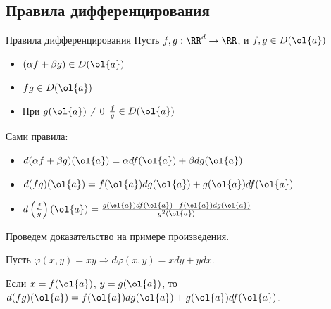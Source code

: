 \subsection{Правила дифференцирования}

\begin{prop}{Правила дифференцирования}{}
    Пусть \( f, g : \RR^d \to \RR \), и \( f, g \in D(\ol{a}) \)

    \begin{itemize}
        \item
            \( (\alpha f + \beta g) \in D(\ol{a}) \)
        \item
            \( fg \in D(\ol{a}) \)
        \item
            При \( g(\ol{a}) \neq 0 \) \( \frac{f}{g} \in D(\ol{a}) \)
    \end{itemize}

    Сами правила:
    \begin{itemize}
        \item
            \( d (\alpha f + \beta g) ( \ol{a} ) = \alpha df (\ol{a}) + \beta dg (\ol{a}) \)
        \item
            \( d (fg) ( \ol{a} ) = f(\ol{a}) dg(\ol{a}) + g(\ol{a}) df (\ol{a}) \)
        \item
            \( d \left( \frac{f}{g} \right) ( \ol{a} ) = \frac{g(\ol{a}) df (\ol{a}) - f(\ol{a}) dg (\ol{a}) }{g^2(\ol{a})} \)
    \end{itemize}
\end{prop}

Проведем доказательство на примере произведения.

Пусть \( \varphi(x, y) = xy \Rightarrow d \varphi (x, y) = x dy + y dx \).

Если \( x = f(\ol{a}) \), \( y = g(\ol{a}) \),
то \( d (fg) (\ol{a}) = f (\ol{a}) dg (\ol{a}) + g (\ol{a}) df (\ol{a}) \).

